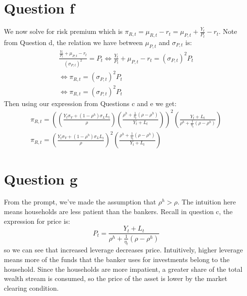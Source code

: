 \documentclass{article}
\begin{document}
\section*{Question f}
We now solve for risk premium which is $\pi_{R, t} = \mu_{R, t} - r_t = \mu_{P, t} + \frac{Y_t}{P_t} - r_t$. Note from Question d, the relation we have between $\mu_{P, t}$ and $\sigma_{P, t}$ is:
\[
    \begin{aligned}
        \frac{\frac{Y_t}{P_t} + \mu_{P, t} - r_t}{(\sigma_{P, t})^2} = P_t \iff \frac{Y_t}{P_t} + \mu_{P, t} - r_t = (\sigma_{P, t})^2 P_t\\
        \iff \pi_{R, t} = (\sigma_{P, t})^2 P_t\\
        \iff \pi_{R, t} = (\sigma_{P, t})^2 P_t
    \end{aligned}    
\]
Then using our expression from Questions c and e we get:
\[\begin{aligned}
    \pi_{R, t} = \left(\left(\frac{Y_t \sigma_Y + (1 - \rho^h) \sigma_L L_t}{\rho}\right) \left(\frac{\rho^h + \frac{1}{\eta_t}(\rho-\rho^h)}{Y_{t} + L_t} \right)\right)^2 \left(\frac{Y_{t} + L_t}{\rho^h + \frac{1}{\eta_t}(\rho-\rho^h)}\right)\\
    \boxed{\pi_{R, t} = \left(\frac{Y_t \sigma_Y + (1 - \rho^h) \sigma_L L_t}{\rho}\right)^2 \left(\frac{\rho^h + \frac{1}{\eta_t}(\rho-\rho^h)}{Y_{t} + L_t} \right)}
\end{aligned}\]
\section*{Question g}
From the prompt, we've made the assumption that $\rho^{h}>\rho$. The intuition here means households are less patient than the bankers. Recall in question c, the expression for price is:
\[
    P_t = \frac{Y_{t} + L_t}{\rho^h + \frac{1}{\eta_t}(\rho-\rho^h)}    
\]
so we can see that increased leverage decreases price. Intuitively, higher leverage means more of the funds that the banker uses for investments belong to the household. Since the households are more impatient, a greater share of the total wealth stream is consumed, so the price of the asset is lower by the market clearing condition.
\end{document}
